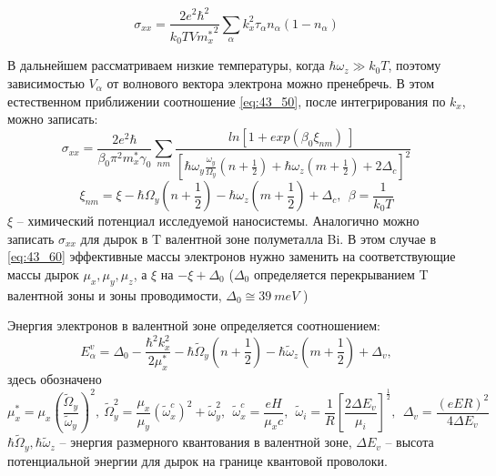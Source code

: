 \begin{equation} \label{eq:43_50} 
{\sigma }_{xx}=\frac{2e^2{\hbar }^2}{k_0TV{m^*_x}^2}\sum_{\alpha }{k^2_x{\tau }_{\alpha }n_{\alpha }\left(1-n_{\alpha }\right)}
\end{equation}

В дальнейшем рассматриваем низкие температуры, когда $\hbar {\omega }_z\gg k_0T$, поэтому зависимостью $V_{\alpha }$ от волнового вектора электрона можно пренебречь. В этом естественном приближении соотношение \eqref{eq:43_50}, после интегрирования по $k_x$, можно записать:
\begin{equation} \label{eq:43_60}
{\sigma }_{xx}=\frac{2e^2\hbar }{{\beta }_0{\pi }^2m^*_x{\gamma }_0}\sum_{nm}{\frac{{ln \left[1+{exp \left({\beta }_0{\xi }_{nm}\right)\ }\right]\ }}{{\left[\hbar {\omega }_y\frac{{\omega }_y}{{\Omega }_y}\left(n+\frac{1}{2}\right)+\hbar {\omega }_z\left(m+\frac{1}{2}\right)+2{\Delta }_c\right]}^2}} 
\end{equation}
\[
{\xi }_{nm}=\xi -\hbar {\Omega }_y\left(n+\frac{1}{2}\right)-\hbar {\omega }_z\left(m+\frac{1}{2}\right)+{\Delta }_c,\ \ \beta =\frac{1}{k_0T}
\]
$\xi $ -- химический потенциал исследуемой наносистемы. Аналогично можно записать ${\sigma }_{xx}$ для дырок в T валентной зоне полуметалла Bi. В этом случае в \eqref{eq:43_60} эффективные массы электронов нужно заменить на соответствующие массы дырок ${\mu }_x,{\mu }_y,{\mu }_z$, а $\xi $  на $-\xi +{\Delta }_0$ (${\Delta }_0$ определяется перекрыванием T валентной зоны и зоны проводимости, ${\Delta }_0\cong 39\ meV$ \cite{Levin2009a}) 

Энергия электронов в валентной зоне определяется соотношением:
\[
E^v_{\alpha }={\Delta }_0-\frac{{\hbar }^2k^2_x}{2{\mu }^*_x}-\hbar {\widetilde{\Omega }}_y\left(n+\frac{1}{2}\right)-\hbar {\widetilde{\omega }}_z\left(m+\frac{1}{2}\right)+{\Delta }_v,
\] 
здесь обозначено
\[
{\mu }^*_x={\mu }_x{\left(\frac{{\widetilde{\Omega }}_y}{{\widetilde{\omega }}_y}\right)}^2,\ {\widetilde{\Omega }}^2_y=\frac{{\mu }_x}{{\mu }_y}{\left({\widetilde{\omega }}^c_x\right)}^2+{\widetilde{\omega }}^2_y,\ \ {\widetilde{\omega }}^c_x=\frac{eH}{{\mu }_xc},\ \ {\widetilde{\omega }}_i=\frac{1}{R}{\left[\frac{2\Delta E_v}{{\mu }_i}\right]}^{\frac{1}{2}},\ \ {\Delta }_v=\frac{{\left(eER\right)}^2}{4\Delta E_v}
\] 
$\hbar {\widetilde{\Omega }}_y, \hbar {\widetilde{\omega }}_z$ -- энергия размерного квантования в валентной зоне, $\Delta E_v$ -- высота потенциальной энергии для дырок на границе квантовой проволоки.

